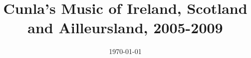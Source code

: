 \documentclass[a4paper,12pt]{article}
\title{Cunla's Music of Ireland, Scotland and Ailleursland, 2005-2009}
\date{\today}
\begin{document}
\maketitle





%




\pagebreak
\tableofcontents


\end{document}
